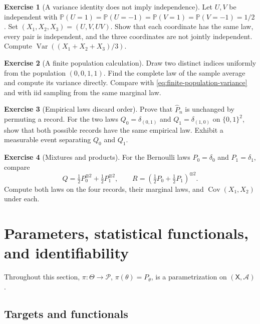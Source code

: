 \documentclass[11pt,oneside]{book}
\theoremstyle{definition}
\newtheorem{exercise}{Exercise}[section]
\theoremstyle{remark}
\begin{document}
\begin{exercise}[A variance identity does not imply independence]
\label{exer:pairwise-independent}
Let $U,V$ be independent with
$\mathbb P(U=1)=\mathbb P(U=-1)=
\mathbb P(V=1)=\mathbb P(V=-1)=1/2$.
Set $(X_1,X_2,X_3)=(U,V,UV)$.
Show that each coordinate has the same law, every pair is independent,
and the three coordinates are not jointly independent.
Compute $\operatorname{Var}((X_1+X_2+X_3)/3)$.
\end{exercise}

\begin{exercise}[A finite population calculation]
\label{exer:finite-population-calculation}
Draw two distinct indices uniformly from the population $(0,0,1,1)$.
Find the complete law of the sample average and compute its variance directly.
Compare with \eqref{eq:finite-population-variance} and with iid sampling
from the same marginal law.
\end{exercise}

\begin{exercise}[Empirical laws discard order]
\label{exer:empirical-order}
Prove that $\widehat P_n$ is unchanged by permuting a record.
For the two laws $Q_0=\delta_{(0,1)}$ and $Q_1=\delta_{(1,0)}$ on
$\{0,1\}^2$, show that both possible records have the same empirical law.
Exhibit a measurable event separating $Q_0$ and $Q_1$.
\end{exercise}

\begin{exercise}[Mixtures and products]
\label{exer:mixture-products}
For the Bernoulli laws $P_0=\delta_0$ and $P_1=\delta_1$, compare
\[
Q=\tfrac12P_0^{\otimes2}+\tfrac12P_1^{\otimes2},
\qquad
R=\left(\tfrac12P_0+\tfrac12P_1\right)^{\otimes2}.
\]
Compute both laws on the four records, their marginal laws, and
$\operatorname{Cov}(X_1,X_2)$ under each.
\end{exercise}

\clearpage
\section{Parameters, statistical functionals, and identifiability}
\label{sec:identifiability}

Throughout this section, $\pi:\Theta\to\mathcal P$,
$\pi(\theta)=P_\theta$, is a parametrization on $(\mathsf X,\mathcal A)$.

\subsection{Targets and functionals}
\label{subsec:targets-functionals}
\end{document}
